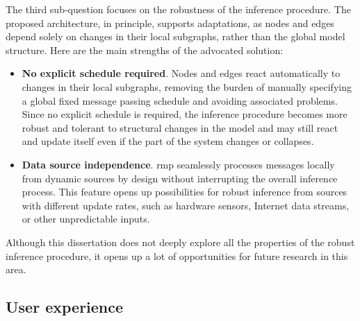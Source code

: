 The third sub-question focuses on the robustness of the inference procedure.
The proposed architecture, in principle, supports adaptations, as nodes and edges depend
solely on changes in their local subgraphs, rather than the global model structure. 
Here are the main strengths of the advocated solution:
\begin{itemize}
  \item \textbf{No explicit schedule required}. 
        Nodes and edges react automatically to changes in their local subgraphs, removing the burden of manually specifying a global fixed message passing schedule and avoiding associated problems. Since no explicit schedule is required, the inference procedure becomes more robust and tolerant to structural changes in the model and may still react and update itself even if the part of the system changes or collapses.
  \item \textbf{Data source independence}.
        \Ac{rmp} seamlessly processes messages locally from dynamic sources by design without interrupting the
        overall inference process. 
        This feature opens up possibilities for robust inference from sources with different update rates, such as
        hardware sensors, Internet data streams, or other unpredictable inputs.
\end{itemize}

Although this dissertation does not deeply explore all the properties of the robust inference
procedure, it opens up a lot of opportunities for future research in this area.

\subsection{User experience}

\begin{questions}[resume] \item \userexperiencequstion
  \label{question:contributions:user-experience}
\end{questions}


